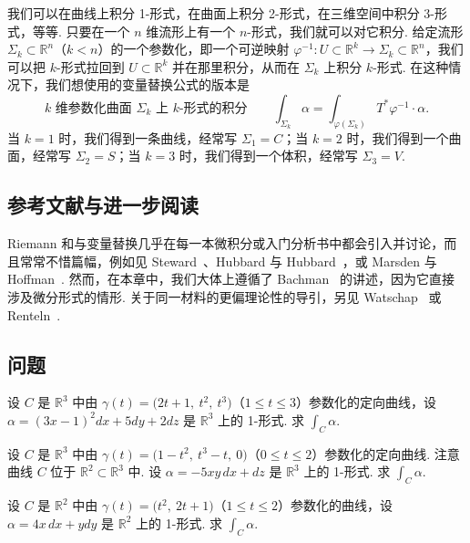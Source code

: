 我们可以在曲线上积分 1-形式，在曲面上积分 2-形式，在三维空间中积分 3-形式，等等. 只要在一个 $n$ 维流形上有一个 $n$-形式，我们就可以对它积分. 给定流形 $\Sigma_k\subset\mathbb{R}^n$（$k<n$）的一个参数化，即一个可逆映射 $\varphi^{-1}:U\subset\mathbb{R}^k\to\Sigma_k\subset\mathbb{R}^n$，我们可以把 $k$-形式拉回到 $U\subset\mathbb{R}^k$ 并在那里积分，从而在 $\Sigma_k$ 上积分 $k$-形式. 在这种情况下，我们想使用的变量替换公式的版本是
\[
\text{$k$ 维参数化曲面 $\Sigma_k$ 上 $k$-形式的积分}\qquad\int_{\Sigma_k}\alpha=\int_{\varphi(\Sigma_k)}T^*\varphi^{-1}\cdot\alpha.
\]
当 $k=1$ 时，我们得到一条曲线，经常写 $\Sigma_1=C$；当 $k=2$ 时，我们得到一个曲面，经常写 $\Sigma_2=S$；当 $k=3$ 时，我们得到一个体积，经常写 $\Sigma_3=V$.

\subsection{参考文献与进一步阅读}

Riemann 和与变量替换几乎在每一本微积分或入门分析书中都会引入并讨论，而且常常不惜篇幅，例如见 Steward~\cite{ref43}、Hubbard 与 Hubbard~\cite{ref27}，或 Marsden 与 Hoffman~\cite{ref31}. 然而，在本章中，我们大体上遵循了 Bachman~\cite{ref04} 的讲述，因为它直接涉及微分形式的情形. 关于同一材料的更偏理论性的导引，另见 Watschap~\cite{ref47} 或 Renteln~\cite{ref37}.

\subsection{问题}

\begin{question}\label{q:7-14}
设 $C$ 是 $\mathbb{R}^3$ 中由 $\gamma(t)=\bigl(2t+1,\ t^2,\ t^3\bigr)$（$1\leq t\leq 3$）参数化的定向曲线，设 $\alpha=(3x-1)^2dx+5dy+2dz$ 是 $\mathbb{R}^3$ 上的 1-形式. 求 $\int_C\alpha$.
\end{question}

\begin{question}\label{q:7-15}
设 $C$ 是 $\mathbb{R}^3$ 中由 $\gamma(t)=\bigl(1-t^2,\ t^3-t,\ 0\bigr)$（$0\leq t\leq 2$）参数化的定向曲线. 注意曲线 $C$ 位于 $\mathbb{R}^2\subset\mathbb{R}^3$ 中. 设 $\alpha=-5xy\,dx+dz$ 是 $\mathbb{R}^3$ 上的 1-形式. 求 $\int_C\alpha$.
\end{question}

\begin{question}\label{q:7-16}
设 $C$ 是 $\mathbb{R}^2$ 中由 $\gamma(t)=\bigl(t^2,\ 2t+1\bigr)$（$1\leq t\leq 2$）参数化的曲线，设 $\alpha=4x\,dx+ydy$ 是 $\mathbb{R}^2$ 上的 1-形式. 求 $\int_C\alpha$.
\end{question}

